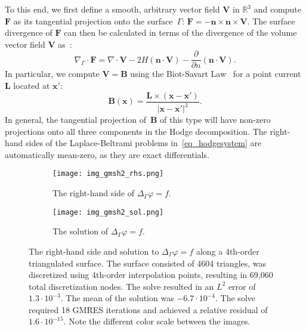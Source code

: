 \documentclass[11pt]{article}
\renewcommand{\phi}{\varphi}
\newcommand{\surfdiv}{\nabla_\Gamma \cdot}
\newcommand{\surflap}{\Delta_\Gamma}
\newcommand{\bbR}{\mathbb R}
\newcommand{\bn}{\bm n}
\newcommand{\bx}{\bm x}
\newcommand{\bL}{\bm L}
\newcommand{\bB}{\bm B}
\newcommand{\bF}{\bm F}
\newcommand{\bV}{\bm V}
\numberwithin{equation}{section}
\begin{document}
To this end, we first define a smooth, arbitrary vector field $\bV$ 
in $\bbR^3$ and compute $\bF$ as its tangential projection onto 
the surface~$\Gamma$: $\bF = -\bn \times \bn \times \bV$.
The surface divergence of $\bF$ can then be calculated in terms of the
divergence of the volume vector field $\bV$ as~\cite{nedelec}:
\begin{equation}
  \surfdiv \bF = \nabla \cdot \bV - 2H \left(\bn \cdot \bV \right) -
  \frac{\partial}{\partial n } \left(\bn \cdot \bV\right).
\end{equation}
%
In particular, we compute $\bV = \bB$ using the Biot-Savart
Law~\cite{jackson}
 for a point current $\bL$ located at $\bx'$:
\begin{equation}
    \bB(\bx) = \frac{\bL \times (\bx - \bx')}{|\bx - \bx'|^3}.
\end{equation}
In general, the tangential projection of~$\bB$
of this type will have non-zero projections onto
all three components in the Hodge decomposition.
The right-hand sides of the Laplace-Beltrami problems
in~\eqref{eq_hodgesystem} are automatically mean-zero, as they are
exact differentials.

\begin{figure}[!t]
  \begin{center}
    \begin{subfigure}[b]{.45\linewidth}
      \centering
      \texttt{[image: img\_gmsh2\_rhs.png]}
      \caption{The right-hand side of $\surflap \phi = f$.}
      \label{fig_gmsh2_rhs}
    \end{subfigure}
    \quad
    \begin{subfigure}[b]{.45\linewidth}
      \centering
      \texttt{[image: img\_gmsh2\_sol.png]}
      \caption{The solution of $\surflap \phi = f$.}
      \label{fig_gmsh2_sol}
    \end{subfigure}
    \caption{The right-hand side and solution to $\surflap \phi = f$
      along a 4th-order triangulated surface. The surface consisted of
      4604 triangles, was discretized using 4th-order interpolation
      points, resulting in 69,060 total discretization nodes. The solve
      resulted in an $L^2$ error of $1.3 \cdot 10^{-3}$.
      The mean of the solution
      was $-6.7\cdot 10^{-4}$.
      The solve required 18 GMRES iterations and achieved a
      relative residual of $1.6 \cdot 10^{-15}$.
      Note the different color scale between the images. }
    \label{fig_gmsh2}
  \end{center}
\end{figure}
\end{document}
